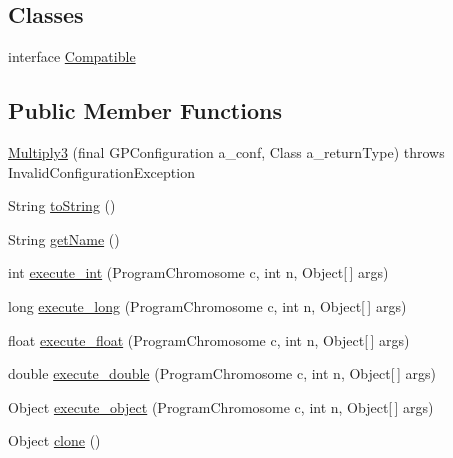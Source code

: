 \subsection*{Classes}
\begin{DoxyCompactItemize}
\item 
interface \hyperlink{interfaceorg_1_1jgap_1_1gp_1_1function_1_1_multiply3_1_1_compatible}{Compatible}
\end{DoxyCompactItemize}
\subsection*{Public Member Functions}
\begin{DoxyCompactItemize}
\item 
\hyperlink{classorg_1_1jgap_1_1gp_1_1function_1_1_multiply3_a96fff5404200f5001ed550e9ba12042e}{Multiply3} (final G\-P\-Configuration a\-\_\-conf, Class a\-\_\-return\-Type)  throws Invalid\-Configuration\-Exception 
\item 
String \hyperlink{classorg_1_1jgap_1_1gp_1_1function_1_1_multiply3_a84752b47b6a6d63b0c8b654c4cb8696a}{to\-String} ()
\item 
String \hyperlink{classorg_1_1jgap_1_1gp_1_1function_1_1_multiply3_a4f5faa7a58119291b1751e6950afb7ca}{get\-Name} ()
\item 
int \hyperlink{classorg_1_1jgap_1_1gp_1_1function_1_1_multiply3_a64bc0e8cf24efd4b77f9cf46a0abd5bd}{execute\-\_\-int} (Program\-Chromosome c, int n, Object\mbox{[}$\,$\mbox{]} args)
\item 
long \hyperlink{classorg_1_1jgap_1_1gp_1_1function_1_1_multiply3_af7287be0f9a5acb9433360d6be2962e8}{execute\-\_\-long} (Program\-Chromosome c, int n, Object\mbox{[}$\,$\mbox{]} args)
\item 
float \hyperlink{classorg_1_1jgap_1_1gp_1_1function_1_1_multiply3_a182062e8dfe5df1a37804eea6b782ef2}{execute\-\_\-float} (Program\-Chromosome c, int n, Object\mbox{[}$\,$\mbox{]} args)
\item 
double \hyperlink{classorg_1_1jgap_1_1gp_1_1function_1_1_multiply3_a4567d01d2ecf3fccb761c5108379153d}{execute\-\_\-double} (Program\-Chromosome c, int n, Object\mbox{[}$\,$\mbox{]} args)
\item 
Object \hyperlink{classorg_1_1jgap_1_1gp_1_1function_1_1_multiply3_a280d5b22782132d7192b026c8629d810}{execute\-\_\-object} (Program\-Chromosome c, int n, Object\mbox{[}$\,$\mbox{]} args)
\item 
Object \hyperlink{classorg_1_1jgap_1_1gp_1_1function_1_1_multiply3_a1e21055fbba4387480ea9869a0f8a09e}{clone} ()
\end{DoxyCompactItemize}
